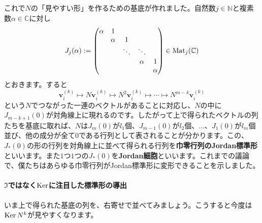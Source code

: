 これで$N$の「見やすい形」を作るための基底が作れました。自然数$j \in \mathbb{N}$と複素数$\alpha \in \mathbb{C}$に対し
\[
J_{j}(\alpha) :=
\begin{pmatrix}
\alpha & 1 \\
& \alpha & 1 \\
& & \ddots & \ddots \\
& & & \alpha & 1 \\
& & & & \alpha
\end{pmatrix}
\in \operatorname{Mat}_j(\mathbb{C})
\]
とおきます。すると
\[
\bm{v}^{(k)}_i \mapsto N \bm{v}^{(k)}_i \mapsto N^2 \bm{v}^{(k)}_i \mapsto \cdots \mapsto N^{m - k} \bm{v}^{(k)}_i
\]
という$N$でつながった一連のベクトルがあることに対応し、$N$の中に$J_{m - k + 1}(0)$が対角線上に現れるのです。したがって上で得られたベクトルの列たちを基底に取れば、$N$は$J_{m}(0)$が$l_1$個、$J_{m - 1}(0)$が$l_2$個、$\ldots$、$J_{1}(0)$が$l_m$個並び、他の成分が全て$0$である行列として表されることが分かります。この、$J_{*}(0)$の形の行列を対角線上に並べて得られる行列を\textbf{巾零行列のJordan標準形}といいます。また$1$つ$1$つの$J_*(0)$を\textbf{Jordan細胞}といいます。これまでの議論で、僕たちはあらゆる巾零行列がJordan標準形に変形できることを示しました。

\paragraph{$\Im$ではなく$\operatorname{Ker}$に注目した標準形の導出}

いま上で得られた基底の列を、右寄せで並べてみましょう。こうすると今度は$\operatorname{Ker} N^k$が見やすくなります。

